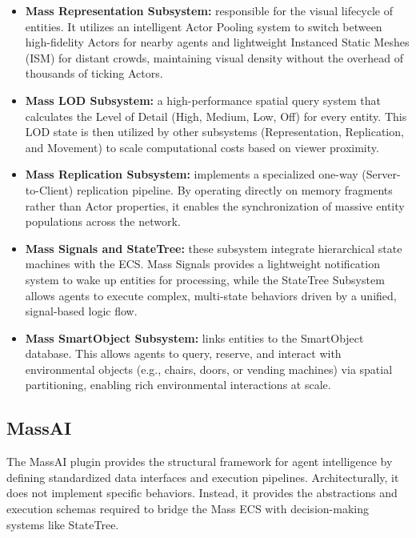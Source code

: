 \begin{itemize}
    \item \textbf{Mass Representation Subsystem:} responsible for the visual lifecycle of entities. It utilizes an intelligent Actor Pooling system to switch between high-fidelity Actors for nearby agents and lightweight Instanced Static Meshes (ISM) for distant crowds, maintaining visual density without the overhead of thousands of ticking Actors.
    \item \textbf{Mass LOD Subsystem:} a high-performance spatial query system that calculates the Level of Detail (High, Medium, Low, Off) for every entity. This LOD state is then utilized by other subsystems (Representation, Replication, and Movement) to scale computational costs based on viewer proximity.
    \item \textbf{Mass Replication Subsystem:} implements a specialized one-way (Server-to-Client) replication pipeline. By operating directly on memory fragments rather than Actor properties, it enables the synchronization of massive entity populations across the network.
    \item \textbf{Mass Signals and StateTree:} these subsystem integrate hierarchical state machines with the ECS. Mass Signals provides a lightweight notification system to wake up entities for processing, while the StateTree Subsystem allows agents to execute complex, multi-state behaviors driven by a unified, signal-based logic flow.
    \item \textbf{Mass SmartObject Subsystem:} links entities to the SmartObject database. This allows agents to query, reserve, and interact with environmental objects (e.g., chairs, doors, or vending machines) via spatial partitioning, enabling rich environmental interactions at scale.
\end{itemize}

\subsection{MassAI}

The MassAI plugin provides the structural framework for agent intelligence by defining standardized data interfaces and execution pipelines. Architecturally, it does not implement specific behaviors. Instead, it provides the abstractions and execution schemas required to bridge the Mass ECS with decision-making systems like StateTree.

